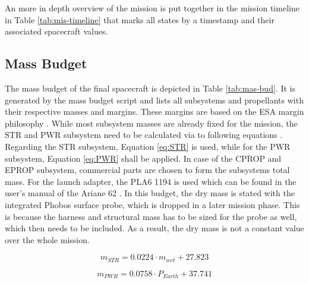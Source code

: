 \documentclass[conference]{IEEEtran}
\begin{document}
An more in depth overview of the mission is put together in the mission timeline in Table \ref{tab:mis-timeline} that marks all states by a timestamp and their associated spacecraft values.


\subsection{Mass Budget}
The mass budget of the final spacecraft is depicted in Table \ref{tab:mas-bud}. It is generated by the mass budget script and lists all subsystems and propellants with their respective masses and margins. These margins are based on the ESA margin philosophy \cite{ESA.2012}. While most subsystem masses are already fixed for the mission, the STR and PWR subsystem need to be calculated via to following equations \cite{Manfletti.2022}. Regarding the STR subsystem, Equation \ref{eq:STR} is used, while for the PWR subsystem, Equation \ref{eq:PWR} shall be applied. In case of the CPROP and EPROP subsystem, commercial parts are chosen to form the subsystems total mass. For the launch adapter, the PLA6 1194 is used which can be found in the user's manual of the Ariane 62 \cite{Arianspace.2016}. In this budget, the dry mass is stated with the integrated Phobos surface probe, which is dropped in a later mission phase. This is because the harness and structural mass has to be sized for the probe as well, which then needs to be included. As a result, the dry mass is not a constant value over the whole mission.

\begin{equation}
m_{STR} = 0.0224 \cdot m_{wet} + 27.823
\label{eq:STR}
\end{equation}

\begin{equation}
m_{PWR} = 0.0758 \cdot P_{Earth} + 37.741
\label{eq:PWR}
\end{equation}
\end{document}
